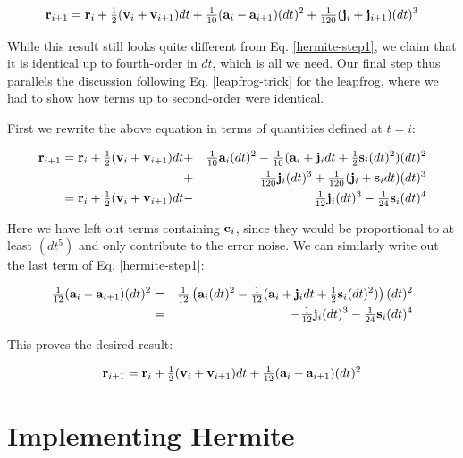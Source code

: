 \begin{equation}
{\bf r}_{i+1} = {\bf r}_i + {\textstyle\frac{1}{2}}({\bf v}_i + {\bf v}_{i+1}) dt
            + {\textstyle\frac{1}{10}}({\bf a}_i - {\bf a}_{i+1})(dt)^2
            + {\textstyle\frac{1}{120}}({\bf j}_i + {\bf j}_{i+1})(dt)^3
\end{equation}

\noindent
While this result still looks quite different from Eq. \ref{hermite-step1},
we claim that it is identical up to fourth-order in $dt$, which is all we
need.  Our final step thus parallels the discussion following
Eq. \ref{leapfrog-trick} for the leapfrog, where we had to show how
terms up to second-order were identical.

First we rewrite the above equation in terms of quantities defined at $t=i$:

\begin{eqnarray}
{\bf r}_{i+1} = {\bf r}_i + {\textstyle\frac{1}{2}}({\bf v}_i + {\bf v}_{i+1}) dt 
             & + & {\textstyle\frac{1}{10}}{\bf a}_i(dt)^2 - {\textstyle\frac{1}{10}}({\bf a}_i + {\bf j}_i dt +
              {\textstyle\frac{1}{2}}{\bf s}_i (dt)^2)(dt)^2                           \nonumber \\
          & + & {\textstyle\frac{1}{120}}{\bf j}_i(dt)^3 + {\textstyle\frac{1}{120}}({\bf j}_i + {\bf s}_i dt)(dt)^3
                                                                 \nonumber \\
          = {\bf r}_i + {\textstyle\frac{1}{2}}({\bf v}_i + {\bf v}_{i+1}) dt 
          & - & {\textstyle\frac{1}{12}}{\bf j}_i (dt)^3 - {\textstyle\frac{1}{24}} {\bf s}_i (dt)^4
\end{eqnarray}

\noindent
Here we have left out terms containing ${\bf c}_i$, since they would be
proportional to at least $(dt^5)$ and only contribute to the error noise.
We can similarly write out the last term of Eq. \ref{hermite-step1}:

\begin{eqnarray}
{\textstyle\frac{1}{12}}({\bf a}_i - {\bf a}_{i+1})(dt)^2  & = & 
              {\textstyle\frac{1}{12}}\left({\bf a}_i(dt)^2 - {\textstyle\frac{1}{12}}({\bf a}_i + {\bf j}_i dt +
              {\textstyle\frac{1}{2}}{\bf s}_i (dt)^2)\right)(dt)^2                     \nonumber \\
             & = & - {\textstyle\frac{1}{12}}{\bf j}_i (dt)^3 - {\textstyle\frac{1}{24}} {\bf s}_i (dt)^4
\end{eqnarray}

\noindent
This proves the desired result:

\begin{equation}
{\bf r}_{i+1} = {\bf r}_i + {\textstyle\frac{1}{2}}({\bf v}_i + {\bf v}_{i+1}) dt +
                {\textstyle\frac{1}{12}}({\bf a}_i - {\bf a}_{i+1})(dt)^2
\end{equation}

\section{Implementing Hermite}

